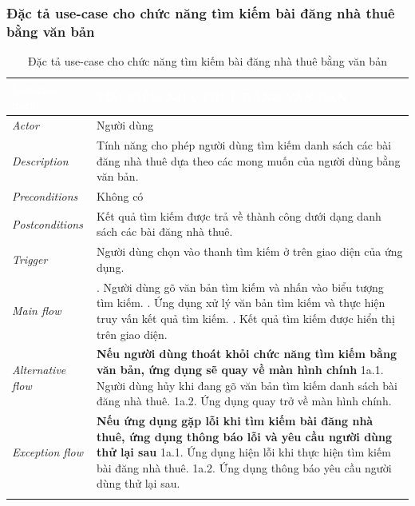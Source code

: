 \subsubsection{Đặc tả use-case cho chức năng tìm kiếm bài đăng nhà thuê bằng văn bản}
\begin{center}
    \arrayrulewidth=2pt
    \begin{longtable}{
        |>{\raggedright\arraybackslash}p{3cm}
        |>{\raggedright\arraybackslash}p{13cm}
        |}
        \hline
        \rowcolor{cyan!75!black} \textcolor{white}{\textbf{Use-case name}} & \textcolor{white}{\textbf{TÌM KIẾM NHÀ THUÊ BẰNG VĂN BẢN}}
        \\\hline
        \rowcolor{cyan!10!white} \textit{Actor} & Người dùng
        \\\hdashline
        \rowcolor{cyan!10!white} \textit{Description} & Tính năng cho phép người dùng tìm kiếm danh sách các bài đăng nhà thuê dựa theo các mong muốn của người dùng bằng văn bản.
        \\\hdashline
        \rowcolor{cyan!10!white} \textit{Preconditions} & Không có
        \\\hdashline
        \rowcolor{cyan!10!white} \textit{Postconditions} & Kết quả tìm kiếm được trả về thành công dưới dạng danh sách các bài đăng nhà thuê.
        \\\hdashline
        \rowcolor{cyan!10!white} \textit{Trigger} & Người dùng chọn vào thanh tìm kiếm ở trên giao diện của ứng dụng.
        \\\hdashline
        \rowcolor{cyan!10!white} \textit{Main flow} &
        1. Người dùng gõ văn bản tìm kiếm và nhấn vào biểu tượng tìm kiếm. \newline
        2. Ứng dụng xử lý văn bản tìm kiếm và thực hiện truy vấn kết quả tìm kiếm. \newline
        3. Kết quả tìm kiếm được hiển thị trên giao diện.
        \\\hdashline
        \rowcolor{cyan!10!white} \textit{Alternative flow} & 
         \textbf{Nếu người dùng thoát khỏi chức năng tìm kiếm bằng văn bản, ứng dụng sẽ quay về màn hình chính} 
        1a.1. Người dùng hủy khi đang gõ văn bản tìm kiếm danh sách bài đăng nhà thuê. \newline
        1a.2. Ứng dụng quay trở về màn hình chính.
        \\\hdashline
        \rowcolor{cyan!10!white} \textit{Exception flow} &
        \textbf{Nếu ứng dụng gặp lỗi khi tìm kiếm bài đăng nhà thuê, ứng dụng thông báo lỗi và yêu cầu người dùng thử lại sau} \newline
        1a.1. Ứng dụng hiện lỗi khi thực hiện tìm kiếm bài đăng nhà thuê. \newline
        1a.2. Ứng dụng thông báo yêu cầu người dùng thử lại sau.
        \\\hline
        \caption{Đặc tả use-case cho chức năng tìm kiếm bài đăng nhà thuê bằng văn bản}
    \end{longtable}
\end{center}
